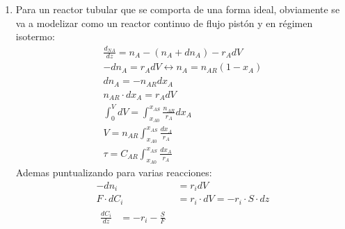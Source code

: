 \begin{enumerate}
\begin{enumerate}[label={\alph*)}]
\begin{figure}[htbp]
\begin{minipage}{0.55\textwidth}
			            \end{minipage}

			            \caption{Representación de E vs $\theta$ para un reactor tubular}
			            \label{fig:sol_2020_1}
		            \end{figure}
		      \item Para un reactor tubular que se comporta de una forma ideal, obviamente se va a modelizar como un reactor continuo de flujo pistón y en régimen isotermo:
		            \begin{align*}
			            \frac{d_{NA}}{dz} = n_A - (n_A +dn_A) - r_A dV                 \\
			            -dn_A = r_A dV  \leftrightarrow n_A = n_{AR}(1-x_A)            \\
			            dn_A = -n_{AR}dx_A                                             \\
			            n_{AR} \cdot dx_A = r_A dV                                     \\
			            \int_0^{V} dV = \int_{x_{A0}}^{x_{AS}} \frac{n_{AR}}{r_A} dx_A \\
			            V = n_{AR}\int_{x_{A0}}^{x_{AS}} \frac{dx_A}{r_A}              \\
			            \tau = C_{AR}\int_{x_{A0}}^{x_{AS}} \frac{dx_A}{r_A}
		            \end{align*}
		            Ademas puntualizando para varias reacciones:
		            \begin{align*}
			            -dn_i        & = r_i dV                               \\
			            F \cdot dC_i & = r_i \cdot dV = -r_i \cdot S \cdot dz \\[1ex]
			            \left.
			            \begin{aligned}
				            \frac{dC_i}{dz} & = -r_i - \frac{S}{F} \\[1ex]

\end{aligned}
\end{align*}
\end{enumerate}
\end{enumerate}
